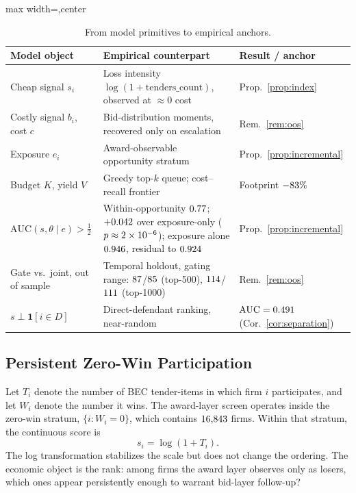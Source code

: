 \begin{table}[htbp]
\centering
\caption{From model primitives to empirical anchors.}
\label{tab:model-empirics}
\footnotesize
\begin{adjustbox}{max width=\textwidth,center}
\begin{threeparttable}
\begin{tabular}{p{3.3cm}p{5.3cm}p{3.6cm}}
\toprule
Model object & Empirical counterpart & Result / anchor \\
\midrule
Cheap signal $s_i$ & Loss intensity $\log(1+\text{tenders\_count})$, observed at $\approx 0$ cost & Prop.~\ref{prop:index} \\
Costly signal $b_i$, cost $c$ & Bid-distribution moments, recovered only on escalation & Rem.~\ref{rem:oos} \\
Exposure $e_i$ & Award-observable opportunity stratum & Prop.~\ref{prop:incremental} \\
Budget $K$, yield $V$ & Greedy top-$k$ queue; cost--recall frontier & Footprint $-83\%$ \\
$\mathrm{AUC}(s,\theta\mid e)>\tfrac12$ & Within-opportunity $0.77$; $+0.042$ over exposure-only ($p\approx2\times10^{-6}$); exposure alone $0.946$, residual to $0.924$ & Prop.~\ref{prop:incremental} \\
Gate vs.\ joint, out of sample & Temporal holdout, gating range: $87$/$85$ (top-500), $114$/$111$ (top-1000) & Rem.~\ref{rem:oos} \\
$s\perp\mathbf{1}[i\in D]$ & Direct-defendant ranking, near-random & $\mathrm{AUC}=0.491$ (Cor.~\ref{cor:separation}) \\
\bottomrule
\end{tabular}
\end{threeparttable}
\end{adjustbox}
\end{table}

\subsection{Persistent Zero-Win Participation}
\label{sec:award_primitive}

Let $T_i$ denote the number of BEC tender-items in which firm
$i$ participates, and let $W_i$ denote the number it wins. The
award-layer screen operates inside the zero-win stratum,
$\{i:W_i=0\}$, which contains $16{,}843$ firms. Within
that stratum, the continuous score is
\[
  s_i=\log(1+T_i).
\]
The log transformation stabilizes the scale but does not change
the ordering. The economic object is the rank: among firms the
award layer observes only as losers, which ones appear
persistently enough to warrant bid-layer follow-up?

